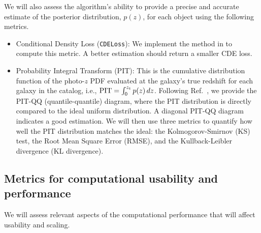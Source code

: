 We will also assess the algorithm's ability to provide a precise and
accurate estimate of the posterior distribution, $p(z)$, for each
object using the following metrics.

\begin{itemize}
    \item{Conditional Density Loss (\texttt{CDELoss}): We implement
      the method in \cite{2017arXiv170408095I} to compute this metric.
      A better estimation should return a smaller CDE loss.}
    \item{Probability Integral Transform (PIT): This is the
        cumulative distribution function of the photo-$z$ PDF evaluated
        at the galaxy's true redshift for each galaxy in the catalog,
        i.e., ${\rm PIT} = \int_{0}^{z_t} p(z)\, dz$.
      Following Ref.~\cite{schmidt_evaluation_2020}, we provide the PIT-QQ
      (quantile-quantile) diagram, where the PIT distribution is
      directly compared to the ideal uniform distribution. 
      A diagonal PIT-QQ diagram indicates a good estimation.          
      We will then use three metrics to quantify how well the PIT
      distribution matches the ideal: the Kolmogorov-Smirnov (KS)
      test, the Root Mean Square Error (RMSE), and the
      Kullback-Leibler divergence (KL divergence).}
\end{itemize}


\subsection{Metrics for computational usability and performance}

We will assess relevant aspects of the computational performance that
will affect usability and scaling. 

